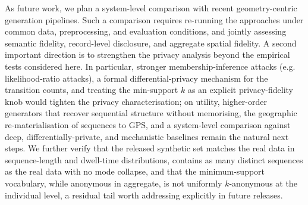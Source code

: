\documentclass[sigconf,nonacm]{acmart}
\begin{document}
As future work, we plan a system-level comparison with recent geometry-centric generation pipelines. Such a comparison requires re-running the approaches under common data, preprocessing, and evaluation conditions, and jointly assessing semantic fidelity,
record-level disclosure, and aggregate spatial fidelity.
A second important direction is to strengthen the privacy analysis beyond the empirical tests considered here. In particular, stronger membership-inference attacks (e.g. likelihood-ratio attacks), a formal differential-privacy mechanism for the transition counts, and treating the min-support $k$ as an explicit privacy-fidelity knob would tighten the privacy characterisation; on utility, higher-order
generators that recover sequential structure without memorising, the geographic re-materialisation
of sequences to GPS, and a system-level comparison against deep, differentially-private, and
mechanistic baselines remain the natural next steps.
We further verify that the released synthetic set matches the real data in sequence-length and dwell-time distributions, contains as many distinct sequences as the real data with no mode collapse, and that the minimum-support vocabulary, while anonymous in aggregate, is not uniformly $k$-anonymous at the individual level,  a residual tail worth addressing explicitly in future releases.

\end{document}
